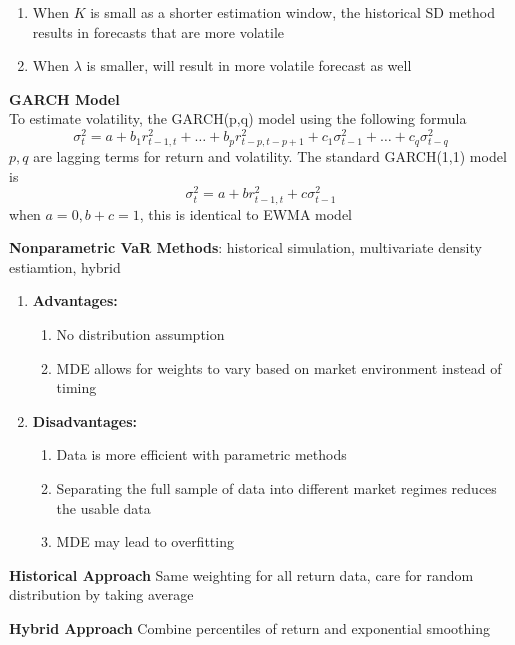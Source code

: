 \documentclass[11pt,fleqn]{book} %
\numberwithin{equation}{section} %
\numberwithin{figure}{section} %
\numberwithin{table}{section} %
\begin{document}
\begin{remark}
\begin{enumerate}
    \item When $K$ is small as a shorter estimation window, the historical SD method results in forecasts that are more volatile
    \item When $\lambda$ is smaller, will result in more volatile forecast as well
\end{enumerate}
\end{remark}
\begin{theorem}\textbf{GARCH Model}\\
To estimate volatility, the GARCH(p,q) model using the following formula
$$
\sigma_t^2=a+b_1r_{t-1,t}^2+\dots+b_{p}r_{t-p,t-p+1}^2+c_1\sigma_{t-1}^2+\dots+c_q\sigma_{t-q}^2
$$
$p,q$ are lagging terms for return and volatility. The standard GARCH(1,1) model is
$$
\sigma_t^2=a+br_{t-1,t}^2+c\sigma_{t-1}^2
$$
when $a=0,b+c=1$, this is identical to EWMA model
\end{theorem}
\begin{definition}\textbf{Nonparametric VaR Methods}: historical simulation, multivariate density estiamtion, hybrid
\begin{enumerate}
    \item \textbf{Advantages:}
    \begin{enumerate}
        \item No distribution assumption
        \item MDE allows for weights to vary based on market environment instead of timing
    \end{enumerate}
    \item \textbf{Disadvantages:}
    \begin{enumerate}
        \item Data is more efficient with parametric methods
        \item Separating the full sample of data into different market regimes reduces the usable data
        \item MDE may lead to overfitting
    \end{enumerate}
\end{enumerate}
\end{definition}
\begin{definition}\textbf{Historical Approach}
Same weighting for all return data, care for random distribution by taking average
\end{definition}
\begin{definition}\textbf{Hybrid Approach}
Combine percentiles of return and exponential smoothing
\end{definition}
\end{document}

